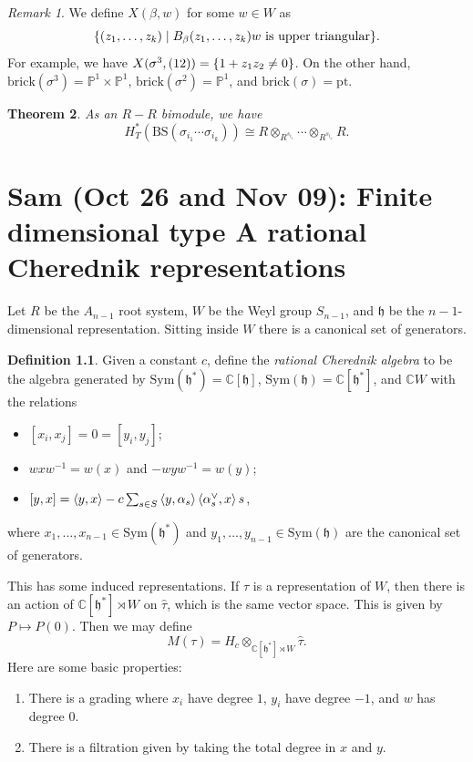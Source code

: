 \documentclass[leqno, openany]{memoir}
\newtheorem{thm}{Theorem}[section]
\theoremstyle{definition}
\newtheorem{defn}[thm]{Definition}
\theoremstyle{remark}
\newtheorem{rmk}[thm]{Remark}
\theoremstyle{plain}
\theoremstyle{definition}
\theoremstyle{remark}
\newcommand{\C}{\mathbb{C}}
\renewcommand{\P}{\mathbb{P}}
\newcommand{\h}{\mathfrak{h}}
\newcommand{\mr}[1]{\mathrm{#1}}
\newcommand{\wh}[1]{\widehat{#1}}
\newcommand{\1}{\mathbf{1}}
\newcommand{\2}{\mathbf{2}}
\newcommand{\3}{\mathbf{3}}
\begin{document}
\begin{rmk}
    We define $X(\beta, w)$ for some $w \in W$ as
    \[ \qty{(z_1, \ldots, z_k) \mid B_{\beta}(z_1, \ldots, z_k) w \text{ is upper triangular}}. \]
    For example, we have $X(\sigma^3, (12)) = \qty{1 + z_1 z_2 \neq 0}$. On the other hand, $\mr{brick}(\sigma^3) = \P^1 \times \P^1$, $\mr{brick}(\sigma^2) = \P^1$, and $\mr{brick}(\sigma) = \mr{pt}$.
\end{rmk}

\begin{thm}
    As an $R-R$ bimodule, we have
    \[ H_T^*(\mr{BS}(\sigma_{i_1} \cdots \sigma_{i_k})) \cong R \otimes_{R^{s_{i_1}}} \cdots \otimes_{R^{s_{i_n}}} R. \]
\end{thm}

\chapter{Sam (Oct 26 and Nov 09): Finite dimensional type A rational Cherednik representations}

Let $R$ be the $A_{n-1}$ root system, $W$ be the Weyl group $S_{n-1}$, and $\h$ be the $n-1$-dimensional representation. Sitting inside $W$ there is a canonical set of generators.

\begin{defn}
    Given a constant $c$, define the \textit{rational Cherednik algebra} to be the algebra generated by $\mr{Sym}(\h^{*}) = \C[\h]$, $\mr{Sym}(\h) = \C[\h^{*}]$, and $\C W$ with the relations
    \begin{itemize}
        \item $[x_{i}, x_{j}] = 0 = [y_{i}, y_{j}]$;
        \item $w x w^{{-1}} = w(x)$ and $-w y w^{-1} = w(y)$;
        \item $[y,x] = \ev{y,x} - c \sum_{s \in S} \ev{y, \alpha_s} \ev{\alpha_s^{\vee}, x} s$,
    \end{itemize}
    where $x_1, \ldots, x_{n-1} \in \mr{Sym}(\h^*)$ and $y_1, \ldots, y_{n-1} \in \mr{Sym}(\h)$ are the canonical set of generators.
\end{defn}

This has some induced representations. If $\tau$ is a representation of $W$, then there is an action of $\C[\h^*] \rtimes W$ on $\wh{\tau}$, which is the same vector space. This is given by $P \mapsto P(0)$. Then we may define
\[ M(\tau) = H_c \otimes_{\C[\h^*] \rtimes W} \wh{\tau}. \]
Here are some basic properties:
\begin{enumerate}
    \item There is a grading where $x_i$ have degree $1$, $y_i$ have degree $-1$, and $w$ has degree $0$.
    \item There is a filtration given by taking the total degree in $x$ and $y$.
\end{enumerate}
\end{document}
